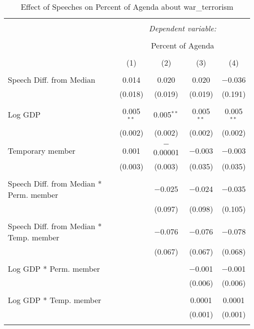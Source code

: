 
\begin{table}[!htbp] \centering 
  \caption{Effect of Speeches on Percent of Agenda about war_terrorism} 
  \label{} 
\begin{tabular}{@{\extracolsep{5pt}}lcccc} 
\\[-1.8ex]\hline 
\hline \\[-1.8ex] 
 & \multicolumn{4}{c}{\textit{Dependent variable:}} \\ 
\cline{2-5} 
\\[-1.8ex] & \multicolumn{4}{c}{Percent of Agenda} \\ 
\\[-1.8ex] & (1) & (2) & (3) & (4)\\ 
\hline \\[-1.8ex] 
 Speech Diff. from Median & 0.014 & 0.020 & 0.020 & $-$0.036 \\ 
  & (0.018) & (0.019) & (0.019) & (0.191) \\ 
  & & & & \\ 
 Log GDP & 0.005$^{**}$ & 0.005$^{**}$ & 0.005$^{**}$ & 0.005$^{**}$ \\ 
  & (0.002) & (0.002) & (0.002) & (0.002) \\ 
  & & & & \\ 
 Temporary member & 0.001 & $-$0.00001 & $-$0.003 & $-$0.003 \\ 
  & (0.003) & (0.003) & (0.035) & (0.035) \\ 
  & & & & \\ 
 Speech Diff. from Median * Perm. member &  & $-$0.025 & $-$0.024 & $-$0.035 \\ 
  &  & (0.097) & (0.098) & (0.105) \\ 
  & & & & \\ 
 Speech Diff. from Median * Temp. member &  & $-$0.076 & $-$0.076 & $-$0.078 \\ 
  &  & (0.067) & (0.067) & (0.068) \\ 
  & & & & \\ 
 Log GDP * Perm. member &  &  & $-$0.001 & $-$0.001 \\ 
  &  &  & (0.006) & (0.006) \\ 
  & & & & \\ 
 Log GDP * Temp. member &  &  & 0.0001 & 0.0001 \\ 
  &  &  & (0.001) & (0.001) \\ 
  & & & & \\ 

\end{tabular}
\end{table}
